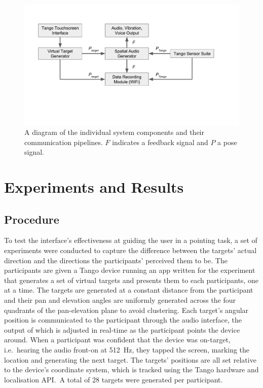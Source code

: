 \documentclass{llncs}
\begin{document}
\begin{figure}[t]
  \centering
  \includegraphics[clip=true, trim=0 120 80 50, width=0.9\columnwidth]{figures/pipeline.pdf}
  \caption{A diagram of the individual system components and their communication pipelines. $F$ indicates a feedback signal and $P$ a pose signal. }\label{fig:pipeline}
\end{figure}


\section{Experiments and Results}\label{sec:experiment-and-results}

\subsection{Procedure}

To test the interface's effectiveness at guiding the user in a pointing task, a set of experiments were conducted to capture the difference between the targets' actual direction and the directions the participants' perceived them to be.
The participants are given a Tango device running an app written for the experiment that generates a set of virtual targets and presents them to each participants, one at a time. 
The targets are generated at a constant distance from the participant and their pan and elevation angles are uniformly generated across the four quadrants of the pan-elevation plane to avoid clustering.
Each target's angular position is communicated to the participant through the audio interface, the output of which is adjusted in real-time as the participant points the device around. 
When a participant was confident that the device was on-target, i.e.~hearing the audio front-on at \SI{512}{\hertz}, they tapped the screen, marking the location and generating the next target.
The targets' positions are all set relative to the device's coordinate system, which is tracked using the Tango hardware and localisation API.\
A total of 28 targets were generated per participant. 
\end{document}
